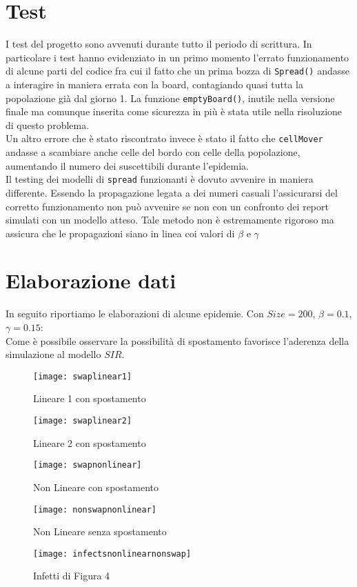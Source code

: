 \documentclass[a4paper]{article}
\begin{document}
\section{Test}
I test del progetto sono avvenuti durante tutto il periodo di scrittura. In particolare i test hanno evidenziato in un primo momento l'errato funzionamento di alcune parti del codice fra cui il fatto che un prima bozza di \texttt{Spread()} andasse a interagire in maniera errata con la board, contagiando quasi tutta la popolazione già dal giorno 1. La funzione \texttt{emptyBoard()}, inutile nella versione finale ma comunque inserita come sicurezza in più è stata utile nella risoluzione di questo problema.\\
 Un altro errore che è stato riscontrato invece è stato il fatto che \texttt{cellMover} andasse a scambiare anche celle del bordo con celle della popolazione, aumentando il numero dei suscettibili durante l'epidemia.\\
 Il testing dei modelli di \texttt{spread} funzionanti è dovuto avvenire in maniera differente. Essendo la propagazione legata a dei numeri casuali l'assicurarsi del corretto funzionamento non può avvenire se non con un confronto dei report simulati con un modello atteso. Tale metodo non è estremamente rigoroso ma assicura che le propagazioni siano in linea coi valori di $\beta$ e $\gamma$
 
\section{Elaborazione dati}
 In seguito riportiamo le elaborazioni di alcune epidemie. Con $Size = 200$, $\beta = 0.1$, $\gamma = 0.15$:\\
 Come è possibile osservare la possibilità di spostamento favorisce l'aderenza della simulazione al modello $SIR$.\\
\begin{figure}[!h]
	\centering
	\texttt{[image: swaplinear1]}
	\caption[Lineare 1 con spostamento]{Lineare 1 con spostamento}
	\label{fig:swaplinear1}
\end{figure}
\begin{figure}[!h]
	\centering
	\texttt{[image: swaplinear2]}
	\caption[Lineare 2 con spostamento]{Lineare 2 con spostamento}
	\label{fig:swaplinear1}
\end{figure}
\begin{figure}[!h]
	\centering
	\texttt{[image: swapnonlinear]}
	\caption[nonLineare  con spostamento]{Non Lineare con spostamento}
	\label{fig:swaplinear1}
\end{figure}
\begin{figure}[!h]
	\centering
	\texttt{[image: nonswapnonlinear]}
	\caption[nonLineare noSpostamento]{Non Lineare senza spostamento}
	\label{fig:swaplinear1}
\end{figure}
\begin{figure}[!h]
	\centering
	\texttt{[image: infectsnonlinearnonswap]}
	\caption[Infetti nonLineare noSpostamento]{Infetti di Figura 4}
	\label{fig:swaplinear1}
\end{figure}
\end{document}

